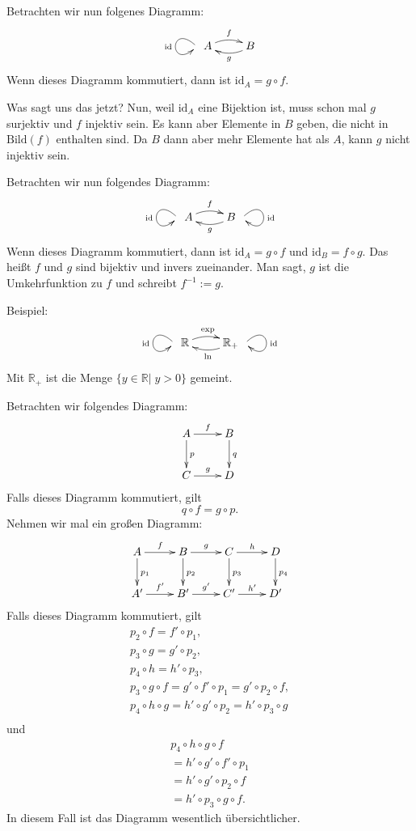 \documentclass[a4paper,12pt,fleqn]{article}
\begin{document}
Betrachten wir nun folgenes Diagramm:
\[\xymatrix{\ar@(ul,dl)_{\mathrm{id}}}
\xymatrix{A \ar@/^/[r]^f & \ar@/^/[l]^g B}\]
Wenn dieses Diagramm kommutiert, dann ist \(\mathrm{id}_A=g\circ f\).

Was sagt uns das jetzt? Nun, weil \(\mathrm{id}_A\) eine Bijektion
ist, muss schon mal \(g\) surjektiv und \(f\) injektiv sein.
Es kann aber Elemente in \(B\) geben, die nicht in
\(\mathrm{Bild}(f)\) enthalten sind. Da \(B\) dann
aber mehr Elemente hat als \(A\), kann \(g\) nicht injektiv sein.

Betrachten wir nun folgendes Diagramm:
\[\xymatrix{\ar@(ul,dl)_{\mathrm{id}}}
\xymatrix{A \ar@/^/[r]^f & \ar@/^/[l]^g B}
\xymatrix{\ar@(ur,dr)^{\mathrm{id}}}\]
Wenn dieses Diagramm kommutiert, dann ist \(\mathrm{id}_A=g\circ f\)
und \(\mathrm{id}_B=f\circ g\). Das heißt \(f\) und \(g\) sind
bijektiv und invers zueinander. Man sagt, \(g\) ist die
Umkehrfunktion zu \(f\) und schreibt \(f^{-1}:=g\).

Beispiel:
\[\xymatrix{\ar@(ul,dl)_{\mathrm{id}}}
\xymatrix{\mathbb R \ar@/^/[r]^{\mathrm{exp}} & \ar@/^/[l]^{\mathrm{ln}} \mathbb R_+}
\xymatrix{\ar@(ur,dr)^{\mathrm{id}}}\]
Mit \(\mathbb R_+\) ist die Menge \(\{y\in\mathbb R|\; y>0\}\)
gemeint.

Betrachten wir folgendes Diagramm:
\[\xymatrix{A \ar[r]^f \ar[d]^p & \ar[d]^q B\\
C \ar[r]^g & D}
\]
Falls dieses Diagramm kommutiert, gilt
\[q\circ f = g\circ p.\]
Nehmen wir mal ein großen Diagramm:
\[\xymatrix{A\ar[r]^f\ar[d]^{p_1} & B \ar[r]^g
\ar[d]^{p_2} & C \ar[r]^h\ar[d]^{p_3} & \ar[d]^{p_4} D\\
A' \ar[r]^{f'} & B' \ar[r]^{g'}& C' \ar[r]^{h'} & D'}
\]
Falls dieses Diagramm kommutiert, gilt
\begin{gather*}
p_2\circ f = f'\circ p_1,\\
p_3\circ g = g'\circ p_2,\\
p_4\circ h = h'\circ p_3,\\
p_3\circ g\circ f = g'\circ f'\circ p_1
= g'\circ p_2\circ f,\\
p_4\circ h\circ g = h'\circ g'\circ p_2
= h'\circ p_3\circ g\\
\end{gather*}
und
\begin{gather*}
p_4\circ h\circ g\circ f\\
= h'\circ g'\circ f'\circ p_1\\
= h'\circ g'\circ p_2\circ f\\
= h'\circ p_3\circ g\circ f.
\end{gather*}
In diesem Fall ist das Diagramm wesentlich
übersichtlicher.
\end{document}
